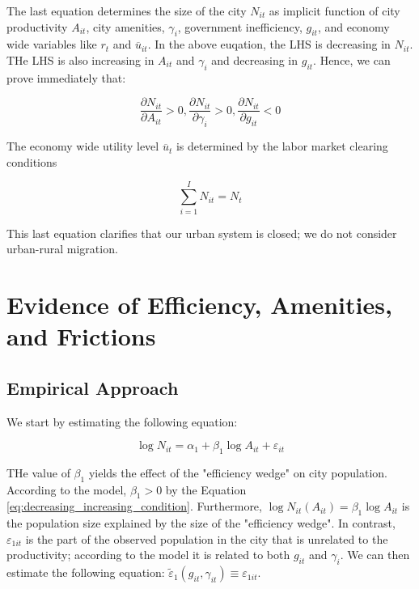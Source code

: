 The last equation determines the size of the city $N_{it}$ as implicit function of city productivity $A_{it}$, city amenities, $\gamma_{i}$, government inefficiency, $g_{it}$, and economy wide variables like $r_t$ and $\overline{u}_{it}$. In the above euqation, the LHS is decreasing in $N_{it}$. THe LHS is also increasing in $A_{it}$ and $\gamma_i$ and decreasing in $g_{it}$. Hence, we can prove immediately that:

\begin{equation}
    \frac{\partial N_{it}}{\partial A_{it}} > 0, \frac{\partial N_{it}}{\partial \gamma_i} > 0, \frac{\partial N_{it}}{\partial g_{it}} < 0 \label{eq:decreasing_increasing_condition}
\end{equation}

The economy wide utility level $\overline{u}_t$ is determined by the labor market clearing conditions

\begin{equation}
    \sum_{i=1}^I N_{it} = N_t
\end{equation}

This last equation clarifies that our urban system is closed; we do not consider urban-rural migration.

\section{Evidence of Efficiency, Amenities, and Frictions}

\subsection{Empirical Approach}

We start by estimating the following equation:

\begin{equation}
    \log N_{it} = \alpha_1 + \beta_1 \log A_{it} + \varepsilon_{it}
\end{equation}

THe value of $\beta_1$ yields the effect of the "efficiency wedge" on city population. According to the model, $\beta_1 > 0$ by the Equation \eqref{eq:decreasing_increasing_condition}. Furthermore, $\log N_{it}(A_{it}) = \beta_1 \log A_{it}$ is the population size explained by the size of the "efficiency wedge". In contrast, $\varepsilon_{1it}$ is the part of the observed population in the city that is unrelated to the productivity; according to the model it is related to both $g_{it}$ and $\gamma_i$. We can then estimate the following equation: $\tilde{\varepsilon}_{1}(g_{it}, \gamma_{it}) \equiv \varepsilon_{1it}$.

